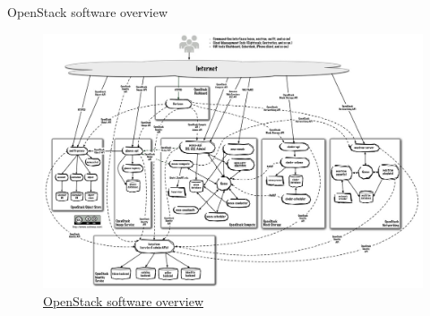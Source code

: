 \documentclass[english,serif,mathserif,usenames,dvipsnames]{beamer}
\begin{document}
\begin{frame}
  {OpenStack software overview}
  \begin{figure}[ht]
    \centering
    \includegraphics[width=\linewidth]{openstack-arch-havana-logical-v1.jpg}
    
  \caption*{\href{http://docs.openstack.org/training-guides/content/figures/5/a/figures/openstack-arch-havana-logical-v1.jpg}{OpenStack software overview}}
\end{figure}
\end{frame}
\end{document}
